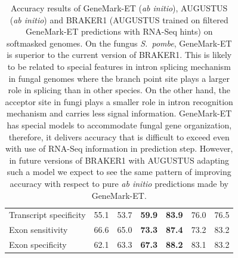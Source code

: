 \documentclass[a4paper,10pt]{report}
\begin{document}
\begin{table}
\begin{center}
\begin{scriptsize}
\begin{tabular}{|l|ccc|ccc|}
Transcript specificity & 55.1 & 53.7 &\textbf{ 59.9} & \textbf{83.9} & 76.0 & 76.5\\
Exon sensitivity       & 66.6 & 65.0 & \textbf{73.3} & \textbf{87.4} & 73.2 & 83.2\\
Exon specificity       & 62.1 & 63.3 & \textbf{67.3} & \textbf{88.2} & 83.1 & 83.2\\
\hline
 \end{tabular}
\end{scriptsize}
\end{center}
\caption{Accuracy results of GeneMark-ET (\textit{ab initio}), AUGUSTUS (\textit{ab initio}) and BRAKER1 (AUGUSTUS trained on filtered GeneMark-ET predictions with RNA-Seq hints) on softmasked genomes.
On the fungus \textit{S.~pombe}, GeneMark-ET is superior to the current version of BRAKER1. This is likely to be related to special features in intron splicing mechanism in fungal genomes where the branch point site plays a larger role in splicing than in other species. On the other hand, the acceptor site in fungi plays a smaller role in intron recognition mechanism and carries less signal information. GeneMark-ET has special models to accommodate fungal gene organization, therefore, it delivers accuracy that is difficult to exceed even with use of RNA-Seq information in prediction step. However, in future versions of BRAKER1 with AUGUSTUS adapting such a model we expect to see the same pattern of improving accuracy with respect to pure \textit{ab initio} predictions made by GeneMark-ET. \label{compare}}
\end{table}
\end{document}
